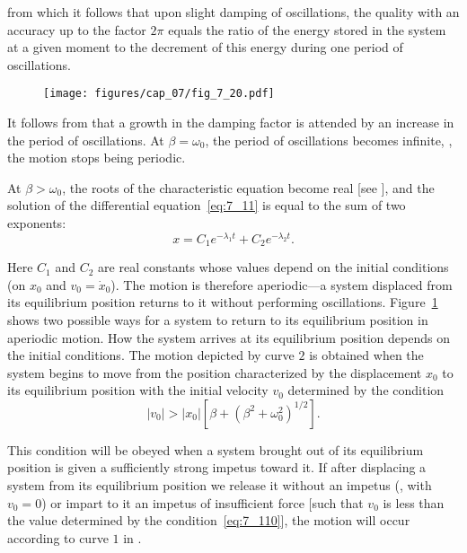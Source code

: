 \noindent
from which it follows that upon slight damping of oscillations, the quality with an accuracy up to the factor $2\pi$ equals the ratio of the energy stored in the system at a given moment to the decrement of this energy during one period of oscillations.

\begin{figure}[t]
	\begin{center}
		\texttt{[image: figures/cap\_07/fig\_7\_20.pdf]}
		\caption[]{}
		\label{fig:7_20}
	\end{center}
	\vspace{-0.8cm}
\end{figure}

It follows from  that a growth in the damping factor is attended by an increase in the period of oscillations. At $\beta=\omega_0$, the period of oscillations becomes infinite, \ie, the motion stops being periodic. 

At $\beta>\omega_0$, the roots of the characteristic equation become real [see ], and the solution of the differential equation~\eqref{eq:7_11} is equal to the sum of two exponents:
\begin{equation*}
	x = C_1e^{-\lambda_1 t} + C_2e^{-\lambda_2 t}.
\end{equation*}

\noindent
Here $C_1$ and $C_2$ are real constants whose values depend on the initial conditions (on $x_0$ and $v_0=\dot{x}_0$). The motion is therefore aperiodic---a system displaced from its equilibrium position returns to it without performing oscillations. Figure~\ref{fig:7_20} shows two possible ways for a system to return to its equilibrium position in aperiodic motion. How the system arrives at its equilibrium position depends on the initial conditions. The motion depicted by curve $2$ is obtained when the system begins to move from the position characterized by the displacement $x_0$ to its equilibrium position with the initial velocity $v_0$ determined by the condition
\begin{equation}\label{eq:7_110}
	|v_0| > |x_0|\left[\beta + \left(\beta^2 + \omega_0^2\right)^{1/2}\right].
\end{equation}

\noindent
This condition will be obeyed when a system brought out of its equilibrium position is given a sufficiently strong impetus toward it. If after displacing a system from its equilibrium position we release it without an impetus (\ie, with $v_0=0$) or impart to it an impetus of insufficient force [such that $v_0$ is less than the value determined by the condition~\eqref{eq:7_110}], the motion will occur according to curve $1$ in .

